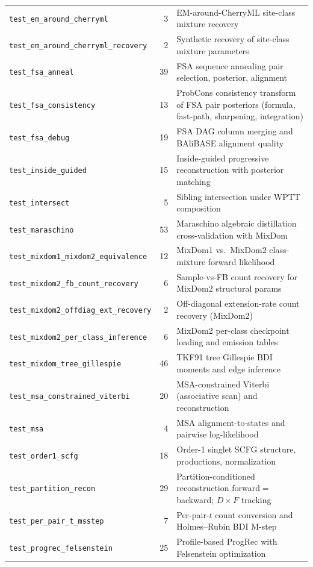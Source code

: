 \begin{table}[htbp]
\begin{tabular}{@{}lrl@{}}
\texttt{test\_em\_around\_cherryml} & 3 & EM-around-CherryML site-class mixture recovery \\
\texttt{test\_em\_around\_cherryml\_recovery} & 2 & Synthetic recovery of site-class mixture parameters \\
\texttt{test\_fsa\_anneal} & 39 & FSA sequence annealing pair selection, posterior, alignment \\
\texttt{test\_fsa\_consistency} & 13 & ProbCons consistency transform of FSA pair posteriors (formula, fast-path, sharpening, integration) \\
\texttt{test\_fsa\_debug} & 19 & FSA DAG column merging and BAliBASE alignment quality \\
\texttt{test\_inside\_guided} & 15 & Inside-guided progressive reconstruction with posterior matching \\
\texttt{test\_intersect} & 5 & Sibling intersection under WPTT composition \\
\texttt{test\_maraschino} & 53 & Maraschino algebraic distillation cross-validation with MixDom \\
\texttt{test\_mixdom1\_mixdom2\_equivalence} & 12 & MixDom1 vs.\ MixDom2 class-mixture forward likelihood \\
\texttt{test\_mixdom2\_fb\_count\_recovery} & 6 & Sample-vs-FB count recovery for MixDom2 structural params \\
\texttt{test\_mixdom2\_offdiag\_ext\_recovery} & 2 & Off-diagonal extension-rate count recovery (MixDom2) \\
\texttt{test\_mixdom2\_per\_class\_inference} & 6 & MixDom2 per-class checkpoint loading and emission tables \\
\texttt{test\_mixdom\_tree\_gillespie} & 46 & TKF91 tree Gillespie BDI moments and edge inference \\
\texttt{test\_msa\_constrained\_viterbi} & 20 & MSA-constrained Viterbi (associative scan) and reconstruction \\
\texttt{test\_msa} & 4 & MSA alignment-to-states and pairwise log-likelihood \\
\texttt{test\_order1\_scfg} & 18 & Order-1 singlet SCFG structure, productions, normalization \\
\texttt{test\_partition\_recon} & 29 & Partition-conditioned reconstruction forward$=$backward; $D{\times}F$ tracking \\
\texttt{test\_per\_pair\_t\_msstep} & 7 & Per-pair-$t$ count conversion and Holmes--Rubin BDI M-step \\
\texttt{test\_progrec\_felsenstein} & 25 & Profile-based ProgRec with Felsenstein optimization \\

\end{tabular}
\end{table}
